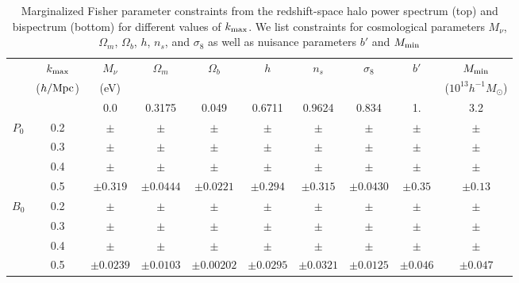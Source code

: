 \documentclass[12pt, letterpaper, preprint]{aastex62}
\newcommand{\smnu}{M_\nu}
\newcommand{\sig}{\sigma_8}
\begin{document}
\begin{table}
    \caption{Marginalized Fisher parameter constraints from the redshift-space halo power 
    spectrum (top) and bispectrum (bottom) for different values of $k_{\rm max}$. We list 
    constraints for cosmological parameters $\smnu$, $\Omega_m$, $\Omega_b$, $h$, $n_s$, 
    and $\sig$ as well as nuisance parameters $b'$ and $M_{\rm min}$} 
\begin{center} 
    \begin{tabular}{cccccccccc} \toprule
         & $k_{\rm max}$ & $\smnu$ & $\Omega_m$ & $\Omega_b$ & $h$ & $n_s$ & $\sig$ & $b'$ & $M_{\rm min}$ \\
         & ({\footnotesize $h/{\rm Mpc}$}) &({\footnotesize eV}) & & & & & & & ({\footnotesize $10^{13} h^{-1}M_\odot$}) \\[3pt] \hline\hline

                    &     & 0.0 & 0.3175 & 0.049 & 0.6711 & 0.9624 & 0.834 & 1. & 3.2  \\ 
        $P_0$    & 0.2 & $\pm$ & $\pm$ & $\pm$ & $\pm$ & $\pm$ & $\pm$ & $\pm$ & $\pm$ \\ 
                    & 0.3 & $\pm$ & $\pm$ & $\pm$ & $\pm$ & $\pm$ & $\pm$ & $\pm$ & $\pm$ \\ 
                    & 0.4 & $\pm$ & $\pm$ & $\pm$ & $\pm$ & $\pm$ & $\pm$ & $\pm$ & $\pm$ \\ 
                    & 0.5 & $\pm0.319$ & $\pm 0.0444$ & $\pm 0.0221$ & $\pm0.294$ & $\pm0.315$ & $\pm0.0430$ & $\pm0.35$ & $\pm0.13$  \\ \hline
        $B_0$  & 0.2 & $\pm$ & $\pm$ & $\pm$ & $\pm$ & $\pm$ & $\pm$ & $\pm$ & $\pm$ \\ 
                            & 0.3 & $\pm$ & $\pm$ & $\pm$ & $\pm$ & $\pm$ & $\pm$ & $\pm$ & $\pm$ \\ 
                            & 0.4 & $\pm$ & $\pm$ & $\pm$ & $\pm$ & $\pm$ & $\pm$ & $\pm$ & $\pm$ \\ 
                            & 0.5 & $\pm0.0239$ & $\pm0.0103$ & $\pm0.00202$ & $\pm0.0295$ & $\pm0.0321$ & $\pm0.0125$ & $\pm0.046$ & $\pm0.047$ \\[3pt]
    \hline
\end{tabular} \label{tab:forecast}
\end{center}
\end{table}
\end{document}
